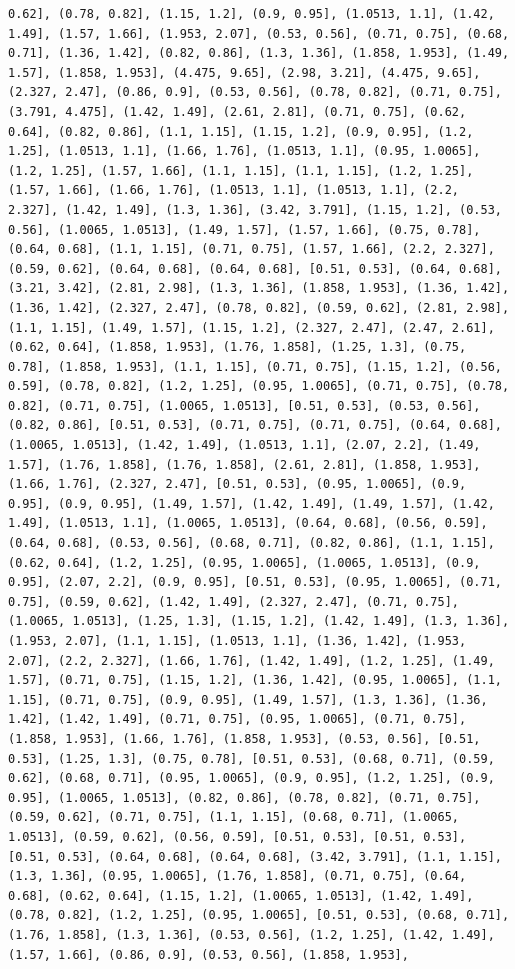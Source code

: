 \documentclass[12pt,fleqn]{article}\usepackage{../common}
\begin{document}
\begin{verbatim}
0.62], (0.78, 0.82], (1.15, 1.2], (0.9, 0.95], (1.0513, 1.1], (1.42, 1.49], (1.57, 1.66], (1.953, 2.07], (0.53, 0.56], (0.71, 0.75], (0.68, 0.71], (1.36, 1.42], (0.82, 0.86], (1.3, 1.36], (1.858, 1.953], (1.49, 1.57], (1.858, 1.953], (4.475, 9.65], (2.98, 3.21], (4.475, 9.65], (2.327, 2.47], (0.86, 0.9], (0.53, 0.56], (0.78, 0.82], (0.71, 0.75], (3.791, 4.475], (1.42, 1.49], (2.61, 2.81], (0.71, 0.75], (0.62, 0.64], (0.82, 0.86], (1.1, 1.15], (1.15, 1.2], (0.9, 0.95], (1.2, 1.25], (1.0513, 1.1], (1.66, 1.76], (1.0513, 1.1], (0.95, 1.0065], (1.2, 1.25], (1.57, 1.66], (1.1, 1.15], (1.1, 1.15], (1.2, 1.25], (1.57, 1.66], (1.66, 1.76], (1.0513, 1.1], (1.0513, 1.1], (2.2, 2.327], (1.42, 1.49], (1.3, 1.36], (3.42, 3.791], (1.15, 1.2], (0.53, 0.56], (1.0065, 1.0513], (1.49, 1.57], (1.57, 1.66], (0.75, 0.78], (0.64, 0.68], (1.1, 1.15], (0.71, 0.75], (1.57, 1.66], (2.2, 2.327], (0.59, 0.62], (0.64, 0.68], (0.64, 0.68], [0.51, 0.53], (0.64, 0.68], (3.21, 3.42], (2.81, 2.98], (1.3, 1.36], (1.858, 1.953], (1.36, 1.42], (1.36, 1.42], (2.327, 2.47], (0.78, 0.82], (0.59, 0.62], (2.81, 2.98], (1.1, 1.15], (1.49, 1.57], (1.15, 1.2], (2.327, 2.47], (2.47, 2.61], (0.62, 0.64], (1.858, 1.953], (1.76, 1.858], (1.25, 1.3], (0.75, 0.78], (1.858, 1.953], (1.1, 1.15], (0.71, 0.75], (1.15, 1.2], (0.56, 0.59], (0.78, 0.82], (1.2, 1.25], (0.95, 1.0065], (0.71, 0.75], (0.78, 0.82], (0.71, 0.75], (1.0065, 1.0513], [0.51, 0.53], (0.53, 0.56], (0.82, 0.86], [0.51, 0.53], (0.71, 0.75], (0.71, 0.75], (0.64, 0.68], (1.0065, 1.0513], (1.42, 1.49], (1.0513, 1.1], (2.07, 2.2], (1.49, 1.57], (1.76, 1.858], (1.76, 1.858], (2.61, 2.81], (1.858, 1.953], (1.66, 1.76], (2.327, 2.47], [0.51, 0.53], (0.95, 1.0065], (0.9, 0.95], (0.9, 0.95], (1.49, 1.57], (1.42, 1.49], (1.49, 1.57], (1.42, 1.49], (1.0513, 1.1], (1.0065, 1.0513], (0.64, 0.68], (0.56, 0.59], (0.64, 0.68], (0.53, 0.56], (0.68, 0.71], (0.82, 0.86], (1.1, 1.15], (0.62, 0.64], (1.2, 1.25], (0.95, 1.0065], (1.0065, 1.0513], (0.9, 0.95], (2.07, 2.2], (0.9, 0.95], [0.51, 0.53], (0.95, 1.0065], (0.71, 0.75], (0.59, 0.62], (1.42, 1.49], (2.327, 2.47], (0.71, 0.75], (1.0065, 1.0513], (1.25, 1.3], (1.15, 1.2], (1.42, 1.49], (1.3, 1.36], (1.953, 2.07], (1.1, 1.15], (1.0513, 1.1], (1.36, 1.42], (1.953, 2.07], (2.2, 2.327], (1.66, 1.76], (1.42, 1.49], (1.2, 1.25], (1.49, 1.57], (0.71, 0.75], (1.15, 1.2], (1.36, 1.42], (0.95, 1.0065], (1.1, 1.15], (0.71, 0.75], (0.9, 0.95], (1.49, 1.57], (1.3, 1.36], (1.36, 1.42], (1.42, 1.49], (0.71, 0.75], (0.95, 1.0065], (0.71, 0.75], (1.858, 1.953], (1.66, 1.76], (1.858, 1.953], (0.53, 0.56], [0.51, 0.53], (1.25, 1.3], (0.75, 0.78], [0.51, 0.53], (0.68, 0.71], (0.59, 0.62], (0.68, 0.71], (0.95, 1.0065], (0.9, 0.95], (1.2, 1.25], (0.9, 0.95], (1.0065, 1.0513], (0.82, 0.86], (0.78, 0.82], (0.71, 0.75], (0.59, 0.62], (0.71, 0.75], (1.1, 1.15], (0.68, 0.71], (1.0065, 1.0513], (0.59, 0.62], (0.56, 0.59], [0.51, 0.53], [0.51, 0.53], [0.51, 0.53], (0.64, 0.68], (0.64, 0.68], (3.42, 3.791], (1.1, 1.15], (1.3, 1.36], (0.95, 1.0065], (1.76, 1.858], (0.71, 0.75], (0.64, 0.68], (0.62, 0.64], (1.15, 1.2], (1.0065, 1.0513], (1.42, 1.49], (0.78, 0.82], (1.2, 1.25], (0.95, 1.0065], [0.51, 0.53], (0.68, 0.71], (1.76, 1.858], (1.3, 1.36], (0.53, 0.56], (1.2, 1.25], (1.42, 1.49], (1.57, 1.66], (0.86, 0.9], (0.53, 0.56], (1.858, 1.953], 
\end{verbatim}
\end{document}
